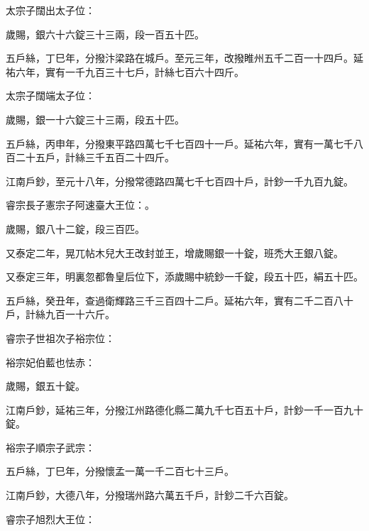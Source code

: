 \begin{pinyinscope}
 太宗子闊出太子位：



 歲賜，銀六十六錠三十三兩，段一百五十匹。



 五戶絲，丁巳年，分撥汴梁路在城戶。至元三年，改撥睢州五千二百一十四戶。延祐六年，實有一千九百三十七戶，計絲七百六十四斤。



 太宗子闊端太子位：



 歲賜，銀一十六錠三十三兩，段五十匹。



 五戶絲，丙申年，分撥東平路四萬七千七百四十一戶。延祐六年，實有一萬七千八百二十五戶，計絲三千五百二十四斤。



 江南戶鈔，至元十八年，分撥常德路四萬七千七百四十戶，計鈔一千九百九錠。



 睿宗長子憲宗子阿速臺大王位：。



 歲賜，銀八十二錠，段三百匹。



 又泰定二年，晃兀帖木兒大王改封並王，增歲賜銀一十錠，班禿大王銀八錠。



 又泰定三年，明裏忽都魯皇后位下，添歲賜中統鈔一千錠，段五十匹，絹五十匹。



 五戶絲，癸丑年，查過衛輝路三千三百四十二戶。延祐六年，實有二千二百八十戶，計絲九百一十六斤。



 睿宗子世祖次子裕宗位：



 裕宗妃伯藍也怯赤：



 歲賜，銀五十錠。



 江南戶鈔，延祐三年，分撥江州路德化縣二萬九千七百五十戶，計鈔一千一百九十錠。



 裕宗子順宗子武宗：



 五戶絲，丁巳年，分撥懷孟一萬一千二百七十三戶。



 江南戶鈔，大德八年，分撥瑞州路六萬五千戶，計鈔二千六百錠。



 睿宗子旭烈大王位：




\end{pinyinscope}

